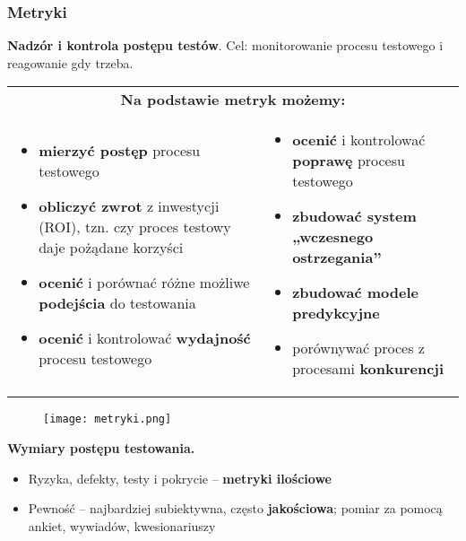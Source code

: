\documentclass[../main.tex]{subfiles}
\begin{document}
    \subsubsection{Metryki}

    \textbf{Nadzór i kontrola postępu testów}. Cel: monitorowanie procesu testowego i reagowanie gdy trzeba.

    \begin{table}[H]
        \begin{center}
            \begin{tabular}{p{8cm} p{8cm}}
                \multicolumn{2}{c}{\textbf{ Na podstawie metryk możemy:}} \\
                \begin{itemize}
                    \item \textbf{mierzyć postęp} procesu testowego
                    \item \textbf{obliczyć zwrot} z inwestycji (ROI), tzn. czy proces testowy daje pożądane korzyści
                    \item \textbf{ocenić} i porównać różne możliwe \textbf{podejścia} do testowania
                    \item \textbf{ocenić} i kontrolować \textbf{wydajność} procesu testowego
                \end{itemize}
                &
                \begin{itemize}
                    \item \textbf{ocenić} i kontrolować \textbf{poprawę} procesu testowego
                    \item \textbf{zbudować system „wczesnego ostrzegania”}
                    \item \textbf{zbudować modele predykcyjne}
                    \item porównywać proces z procesami \textbf{konkurencji}
                \end{itemize} \\
            \end{tabular}
        \end{center}
    \end{table}

    \begin{figure}[H]
        \texttt{[image: metryki.png]}
    \end{figure}

    \textbf{Wymiary postępu testowania.}
    \begin{itemize}
        \item Ryzyka, defekty, testy i pokrycie – \textbf{metryki ilościowe}
        \item Pewność – najbardziej subiektywna, często \textbf{jakościowa}; pomiar za pomocą ankiet, wywiadów, kwesionariuszy
    \end{itemize}
\end{document}
